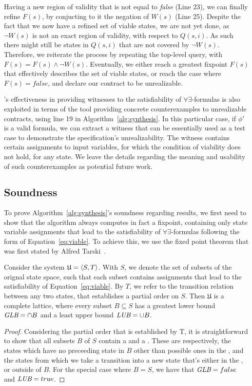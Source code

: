 Having a new region of validity that is not equal to \textit{false} (Line 23),
we can finally refine $F(s)$, by conjucting to it the negation of $W(s)$ (Line 25). Despite the fact that we now have a refined set of viable states, we are not yet done,
as $\lnot W(s)$ is not an exact region of validity, with respect to $Q(s,i)$. As
such there might still be states in $Q(s,i)$ that are not covered by $\lnot W(s)$. Therefore, we reiterate the
process by repeating the top-level \aeval query, with $F(s) = F(s) \land \lnot
W(s)$. Eventually, we either reach a greatest fixpoint $F(s)$ that effectively
describes the set of viable states, or reach the case where $F(s) = false$, and
declare our contract to be unrealizable.

\aeval's effectiveness in providing witnesses to the
satisfiability of $\forall\exists$-formulas is also exploited in terms of the
tool providing concrete counterexamples to unrealizable contracts, using line 19
in Algorithm~\ref{alg:synthesis}. In this particular case, if $\phi'$ is a valid
formula, we can extract a witness that can be essentially used as a test case to
demonstrate the specification's unrealizability. The witness contains
certain assignments to input variables, for which the condition of viability does not
hold, for any state. We leave the details regarding the meaning and usability
of such counterexamples as potential future work.

\subsection{Soundness}
\label{sec:soundness}
To prove Algorithm~\ref{alg:synthesis}'s soundness regarding results, we first need to show that
the algorithm always computes in fact a fixpoint, containing only state variable assignments that lead to the satisfiability of $\forall\exists$-formulas following the form of Equation~\ref{eq:viable}. To achieve this, we
use the fixed point theorem that was first stated by Alfred Tarski~\cite{tarski1955lattice}.



\begin{lemma} Consider the system
$\mathfrak{U} = \langle S, T \rangle$. With $S$, we denote the set of
subsets of the orignal state space, such that each subset contains assignments that lead to the
satisfiability of Equation~\ref{eq:viable}. By $T$, we refer to the
transition relation between any two states, that establishes a partial order
on $S$. Then $\mathfrak{U}$ is a complete lattice, where every subset $B \subseteq
S$ has a greatest lower bound  $\textit {GLB} = \cap B$  and a least upper
bound $\textit {LUB} = \cup B$.
\label{lem:lattice}
\end{lemma}
\begin{proof}
Considering the partial order that is established by T, it is straightforward
to show that all subsets $B$ of $S$ contain a \glb and a \lub. These
are respectively, the states which have no preceeding state in $B$ other than
possible ones in the \glb, and the states from which we take a transition into
a new state that's either in the \lub, or outside of $B$. For the special case
where $B = S$, we have that $\textit {GLB} = false$ and $\textit {LUB} = true$.
\end{proof}

